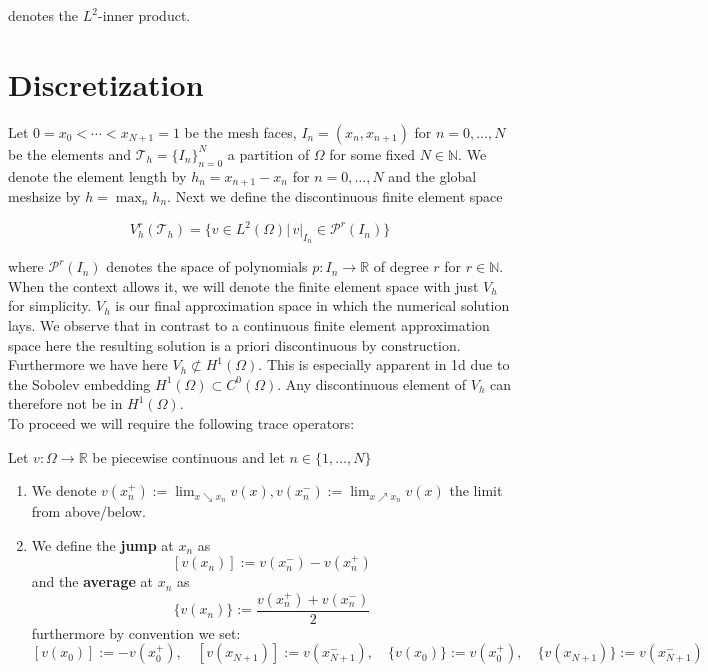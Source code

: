 denotes the $L^2$-inner product.

\section{Discretization}
Let $0=x_0 < \cdots < x_{N+1} = 1$ be the mesh faces, $I_n = (x_n, x_{n+1})$ for $n = 0,\ldots,N$ be the elements and $\mathcal{T}_h = \{I_n\}_{n=0}^N$ a partition
of $\Omega$ for some fixed $N\in \mathbb{N}$.
We denote the element length by $h_n = x_{n+1} - x_{n}$ for $n=0,\ldots,N$ and the global meshsize by
$h = \max_{n} h_n$.
Next we define the discontinuous finite element space
\begin{tcolorbox}[mythmstyle, colback=green!10!white]
	\begin{equation}
		V_h^r(\mathcal{T}_h) = \{v \in L^2(\Omega) |\, v|_{I_n} \in \mathcal{P}^r(I_n) \}
	\end{equation}
\end{tcolorbox}
where $\mathcal{P}^r(I_n)$ denotes the space of polynomials $p:I_n \to \mathbb{R}$ of degree $r$
for $r \in \mathbb{N}$. When the context allows it, we will denote the
finite element space with just $V_h$ for simplicity.
$V_h$ is our final approximation space in which the numerical solution
lays.
We observe that in contrast to a continuous finite element approximation space
here the resulting solution is a priori discontinuous by construction.
Furthermore we have here $V_h \not\subset H^1(\Omega)$.
This is especially apparent in 1d due to the Sobolev embedding $H^1(\Omega) \subset C^0(\Omega)$.
Any discontinuous element of $V_h$ can therefore not be in $H^1(\Omega)$. \\
To proceed we will require the following trace operators:

\begin{definition}
	\label{def:jump_average}
	Let $v:\Omega \to \mathbb{R}$ be piecewise continuous and let $n \in
		\{1,\ldots,N\}$
	\begin{enumerate}[label=\textnormal{(\roman*)}]
		\item We denote $v(x_n^+) := \lim_{x \searrow x_n} v(x), v(x_n^-) := \lim_{x \nearrow x_n} v(x)$
		      the limit from above/below.
		\item We define the \textbf{jump} at $x_n$ as
		      \[
			      [v(x_n)]:= v(x_n^-) - v(x_n^+)
		      \]
		      and the \textbf{average} at $x_n$ as
		      \[
			      \{v(x_n)\}:= \frac{v(x_n^+) + v(x_n^-)}{2}
		      \]
		      furthermore by convention we set:
		      \[
			      [v(x_0)] := -v(x_0^+),\quad [v(x_{N+1})] := v(x_{N+1}^-),\quad
			      \{v(x_0)\}:=v(x_0^+),\quad \{v(x_{N+1})\}:= v(x_{N+1}^-)
		      \]
	\end{enumerate}
\end{definition}

